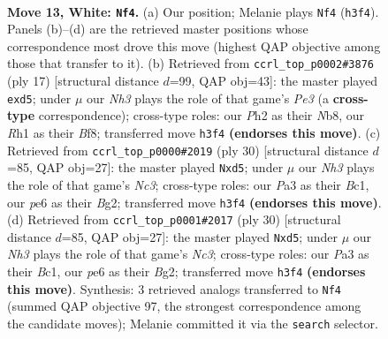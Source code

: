 \documentclass[11pt]{article}
\begin{document}
\clearpage

\begin{figure}[p]\centering
\begin{subfigure}{0.46\textwidth}\centering
\resizebox{\linewidth}{!}{%
\newchessgame
\chessboard[
  setfen={rnbq1k1r/1p2n3/4p3/pQPpPp1p/3B2p1/P1P4N/2P2PPP/R3KB1R w KQ - 0 13},
  showmover=false,
  pgfstyle=straightmove, color=movearrow, markmove={h3-f4}
]}
\caption{}
\end{subfigure}\hfill
\begin{subfigure}{0.46\textwidth}\centering
\resizebox{\linewidth}{!}{%
\newchessgame
\chessboard[
  setfen={rnb1kb1r/pp3ppp/3ppn2/q1pP4/4P3/N1P2P2/PP4PP/R1BQKBNR b KQkq - 1 9},
  showmover=false,
  pgfstyle=straightmove, color=movearrow, markmove={e6-d5}
]}
\caption{}
\end{subfigure}
\\[4pt]
\begin{subfigure}{0.46\textwidth}\centering
\resizebox{\linewidth}{!}{%
\newchessgame
\chessboard[
  setfen={r3k2r/1pq2pp1/1np3p1/p2p2Pn/1b1P4/2N1P2P/PPQ2PB1/R1B2RK1 w kq - 3 16},
  showmover=false,
  pgfstyle=straightmove, color=movearrow, markmove={c3-d5}
]}
\caption{}
\end{subfigure}\hfill
\begin{subfigure}{0.46\textwidth}\centering
\resizebox{\linewidth}{!}{%
\newchessgame
\chessboard[
  setfen={r3k2r/1pq2pp1/1np3p1/p2p2Pn/1b1P4/2N1P2P/PPQ2PB1/R1B2RK1 w kq - 2 16},
  showmover=false,
  pgfstyle=straightmove, color=movearrow, markmove={c3-d5}
]}
\caption{}
\end{subfigure}
\caption{\textbf{Move 13, White: \texttt{Nf4}.} (a) Our position; Melanie plays \texttt{Nf4} (\texttt{h3f4}). Panels (b)--(d) are the retrieved master positions whose correspondence most drove this move (highest QAP objective among those that transfer to it). (b) Retrieved from \texttt{ccrl\_top\_p0002\#3876} (ply 17) [structural distance $d$=99, QAP obj=43]: the master played \texttt{exd5}; under $\mu$ our \emph{Nh3} plays the role of that game's \emph{Pe3} (a \textbf{cross-type} correspondence); cross-type roles: our \emph{P}h2 as their \emph{N}b8, our \emph{R}h1 as their \emph{B}f8; transferred move \texttt{h3f4} \textbf{(endorses this move)}. (c) Retrieved from \texttt{ccrl\_top\_p0000\#2019} (ply 30) [structural distance $d$=85, QAP obj=27]: the master played \texttt{Nxd5}; under $\mu$ our \emph{Nh3} plays the role of that game's \emph{Nc3}; cross-type roles: our \emph{P}a3 as their \emph{B}c1, our \emph{p}e6 as their \emph{B}g2; transferred move \texttt{h3f4} \textbf{(endorses this move)}. (d) Retrieved from \texttt{ccrl\_top\_p0001\#2017} (ply 30) [structural distance $d$=85, QAP obj=27]: the master played \texttt{Nxd5}; under $\mu$ our \emph{Nh3} plays the role of that game's \emph{Nc3}; cross-type roles: our \emph{P}a3 as their \emph{B}c1, our \emph{p}e6 as their \emph{B}g2; transferred move \texttt{h3f4} \textbf{(endorses this move)}. Synthesis: 3 retrieved analogs transferred to \texttt{Nf4} (summed QAP objective 97, the strongest correspondence among the candidate moves); Melanie committed it via the \texttt{search} selector.}
\label{fig:thought-m24}
\end{figure}
\end{document}
